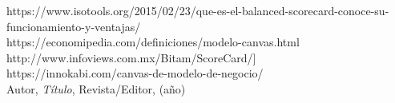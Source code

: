 \begin{thebibliography}{99}
https://www.isotools.org/2015/02/23/que-es-el-balanced-scorecard-conoce-su-funcionamiento-y-ventajas/\\
https://economipedia.com/definiciones/modelo-canvas.html\\
http://www.infoviews.com.mx/Bitam/ScoreCard/]\\
https://innokabi.com/canvas-de-modelo-de-negocio/\\

 Autor, \emph{Título}, Revista/Editor, (año)

\end{thebibliography}


